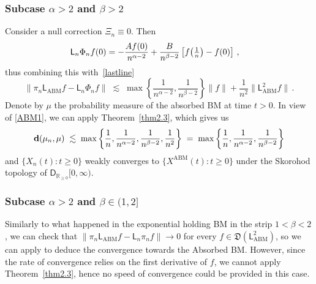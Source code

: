 \documentclass[12pt,a4paper]{article}
\theoremstyle{plain}
\theoremstyle{remark}
\newcommand{\msf}[1]{{\mathsf #1}}
\newcommand{\mf}[1]{{\mathfrak #1}}
\newcommand{\bb}[1]{{\mathbb #1}}
\newcommand{\norm}[1]{\lVert#1\rVert}
\newcommand{\pfrac}[2]{\genfrac{}{}{}{1}{#1}{#2}}
\newcommand{\pn}[1]{\big(\pfrac{#1}{n}\big)}
\begin{document}
	\subsubsection*{\textbf{Subcase \texorpdfstring{$\alpha > 2$}{alpha >2} and \texorpdfstring{$\beta > 2$}{beta>2}}}
	Consider a null correction $\Xi_n \equiv 0$. Then
	\begin{align*}
		\msf{L}_n\Phi_nf(0) &=-\frac{Af(0)}{n^{\alpha - 2}} + \frac{B}{n^{\beta - 2}}\left[f\pn{1} - f(0)\right]\,,
	\end{align*}
	thus combining this with~\eqref{lastline}
	\begin{equation}\label{ABM1}
		\norm{\pi_n\msf{L}_\text{ABM}f - \msf{L}_n\Phi_nf} \;\lesssim\; \max\left\{\frac{1}{n^{\alpha - 2}}, \frac{1}{n^{\beta - 2}}\right\}\norm{f} + \frac{1}{n^2}\|\msf{L}_\text{ABM}^2f\|\,.
	\end{equation}
	Denote by $\mu$ the probability measure of the absorbed BM at time $t>0$. In view of \eqref{ABM1}, we can apply Theorem~\ref{thm2.3}, which gives us
	\begin{equation*}
		{\bf d}(\mu_n, \mu) \;\lesssim\; \max\left\{\frac{1}{n}, \frac{1}{n^{\alpha - 2}}, \frac{1}{n^{\beta - 2}},\frac{1}{n^2}\right\}
		\;=\; \max\left\{\frac{1}{n}, \frac{1}{n^{\alpha - 2}}, \frac{1}{n^{\beta - 2}}\right\}
	\end{equation*}
	and $\{X_{n}(t): t \geq 0\}$ weakly converges to  $\{X^\text{ABM}(t):t \geq 0\}$ under the Skorohod topology of $\msf{D}_{\bb{R}_{\geq 0}}[0,\infty)$.
	
	\subsubsection*{\textbf{Subcase \texorpdfstring{$\alpha > 2$}{alpha >2} and \texorpdfstring{$\beta \in (1,2]$}{beta in (1,2]}}}
	Similarly to what happened in the exponential holding BM in the strip $1<\beta<2$, we can check that $\norm{\pi_n \msf{L}_{\text{ABM}} f-\msf{L}_n \pi_n f }\to 0$ for every $f \in \mf{D}(\msf{L}_{\text{ABM}}^2)$, so we can apply  \citet[Theorem~6.1, page 28 and Theorem~2.11, page~172]{EK}  to deduce  the convergence towards the Absorbed BM. However, since the rate of convergence relies on the first derivative of $f$, we cannot apply   Theorem~\ref{thm2.3}, hence no speed of convergence could be provided in this case.
	
\end{document}
